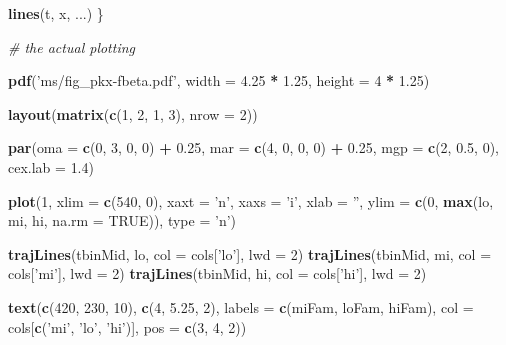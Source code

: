 \documentclass[]{article}
\newenvironment{Shaded}{\begin{snugshade}}{\end{snugshade}}
\newcommand{\KeywordTok}[1]{\textcolor[rgb]{0.13,0.29,0.53}{\textbf{#1}}}
\newcommand{\DataTypeTok}[1]{\textcolor[rgb]{0.13,0.29,0.53}{#1}}
\newcommand{\DecValTok}[1]{\textcolor[rgb]{0.00,0.00,0.81}{#1}}
\newcommand{\FloatTok}[1]{\textcolor[rgb]{0.00,0.00,0.81}{#1}}
\newcommand{\StringTok}[1]{\textcolor[rgb]{0.31,0.60,0.02}{#1}}
\newcommand{\CommentTok}[1]{\textcolor[rgb]{0.56,0.35,0.01}{\textit{#1}}}
\newcommand{\OtherTok}[1]{\textcolor[rgb]{0.56,0.35,0.01}{#1}}
\newcommand{\OperatorTok}[1]{\textcolor[rgb]{0.81,0.36,0.00}{\textbf{#1}}}
\newcommand{\NormalTok}[1]{#1}
\begin{document}
\begin{Shaded}
\begin{Highlighting}[]
{    \KeywordTok{lines}\NormalTok{(t, x, ...)}
\NormalTok{\}}

\CommentTok{# the actual plotting}

\KeywordTok{pdf}\NormalTok{(}\StringTok{'ms/fig_pkx-fbeta.pdf'}\NormalTok{, }\DataTypeTok{width =} \FloatTok{4.25} \OperatorTok{*}\StringTok{ }\FloatTok{1.25}\NormalTok{, }\DataTypeTok{height =} \DecValTok{4} \OperatorTok{*}\StringTok{ }\FloatTok{1.25}\NormalTok{)}

\KeywordTok{layout}\NormalTok{(}\KeywordTok{matrix}\NormalTok{(}\KeywordTok{c}\NormalTok{(}\DecValTok{1}\NormalTok{, }\DecValTok{2}\NormalTok{, }\DecValTok{1}\NormalTok{, }\DecValTok{3}\NormalTok{), }\DataTypeTok{nrow =} \DecValTok{2}\NormalTok{))}

\KeywordTok{par}\NormalTok{(}\DataTypeTok{oma =} \KeywordTok{c}\NormalTok{(}\DecValTok{0}\NormalTok{, }\DecValTok{3}\NormalTok{, }\DecValTok{0}\NormalTok{, }\DecValTok{0}\NormalTok{) }\OperatorTok{+}\StringTok{ }\FloatTok{0.25}\NormalTok{, }\DataTypeTok{mar =} \KeywordTok{c}\NormalTok{(}\DecValTok{4}\NormalTok{, }\DecValTok{0}\NormalTok{, }\DecValTok{0}\NormalTok{, }\DecValTok{0}\NormalTok{) }\OperatorTok{+}\StringTok{ }\FloatTok{0.25}\NormalTok{, }
    \DataTypeTok{mgp =} \KeywordTok{c}\NormalTok{(}\DecValTok{2}\NormalTok{, }\FloatTok{0.5}\NormalTok{, }\DecValTok{0}\NormalTok{), }\DataTypeTok{cex.lab =} \FloatTok{1.4}\NormalTok{)}

\KeywordTok{plot}\NormalTok{(}\DecValTok{1}\NormalTok{, }\DataTypeTok{xlim =} \KeywordTok{c}\NormalTok{(}\DecValTok{540}\NormalTok{, }\DecValTok{0}\NormalTok{), }\DataTypeTok{xaxt =} \StringTok{'n'}\NormalTok{, }\DataTypeTok{xaxs =} \StringTok{'i'}\NormalTok{, }\DataTypeTok{xlab =} \StringTok{''}\NormalTok{, }
     \DataTypeTok{ylim =} \KeywordTok{c}\NormalTok{(}\DecValTok{0}\NormalTok{, }\KeywordTok{max}\NormalTok{(lo, mi, hi, }\DataTypeTok{na.rm =} \OtherTok{TRUE}\NormalTok{)), }\DataTypeTok{type =} \StringTok{'n'}\NormalTok{)}

\KeywordTok{trajLines}\NormalTok{(tbinMid, lo, }\DataTypeTok{col =}\NormalTok{ cols[}\StringTok{'lo'}\NormalTok{], }\DataTypeTok{lwd =} \DecValTok{2}\NormalTok{)}
\KeywordTok{trajLines}\NormalTok{(tbinMid, mi, }\DataTypeTok{col =}\NormalTok{ cols[}\StringTok{'mi'}\NormalTok{], }\DataTypeTok{lwd =} \DecValTok{2}\NormalTok{)}
\KeywordTok{trajLines}\NormalTok{(tbinMid, hi, }\DataTypeTok{col =}\NormalTok{ cols[}\StringTok{'hi'}\NormalTok{], }\DataTypeTok{lwd =} \DecValTok{2}\NormalTok{)}

\KeywordTok{text}\NormalTok{(}\KeywordTok{c}\NormalTok{(}\DecValTok{420}\NormalTok{, }\DecValTok{230}\NormalTok{, }\DecValTok{10}\NormalTok{), }\KeywordTok{c}\NormalTok{(}\DecValTok{4}\NormalTok{, }\FloatTok{5.25}\NormalTok{, }\DecValTok{2}\NormalTok{), }\DataTypeTok{labels =} \KeywordTok{c}\NormalTok{(miFam, loFam, hiFam), }
     \DataTypeTok{col =}\NormalTok{ cols[}\KeywordTok{c}\NormalTok{(}\StringTok{'mi'}\NormalTok{, }\StringTok{'lo'}\NormalTok{, }\StringTok{'hi'}\NormalTok{)], }\DataTypeTok{pos =} \KeywordTok{c}\NormalTok{(}\DecValTok{3}\NormalTok{, }\DecValTok{4}\NormalTok{, }\DecValTok{2}\NormalTok{))}

}
\end{Highlighting}
\end{Shaded}
\end{document}
